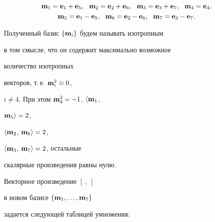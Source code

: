 \begin{gather*}


\bold{m}_1= \bold{e}_{1}+\bold{e}_5,


\ \ \bold{m}_2=\bold{e}_{2}+\bold{e}_6,


\ \ \bold{m}_3=\bold{e}_3+\bold{e}_7,


\ \ \bold{m}_4=\bold{e}_4,\\


%


\bold{m}_5=\bold{e}_1-\bold{e}_5,\ \  \bold{m}_6=\bold{e}_2-\bold{e}_6,


\ \ \bold{m}_7=\bold{e}_3-\bold{e}_7.


\end{gather*}


Полученный базис $\{\bold{m}_i \}$ будем называть изотропным


в том смысле, что он содержит максимально возможное


количество изотропных


векторов, т.\,е. $\bold{m}_i^2\equiv 0$,


$i\neq 4$. При этом $\bold{m}_4^2=-1$, $\langle \bold{m}_1$,


$\bold{m}_5 \rangle =2$,


$\langle \bold{m}_2$, $\bold{m}_6 \rangle =2$,


$\langle \bold{m}_3$, $\bold{m}_7 \rangle =2$, остальные


скалярные произведения равны нулю.





Векторное произведение $[\ ,\ ]$


в новом базисе $ \{ \bold{m}_{1},\dotsc,\bold{m}_{7}\}$


задается следующей таблицей умножения:


